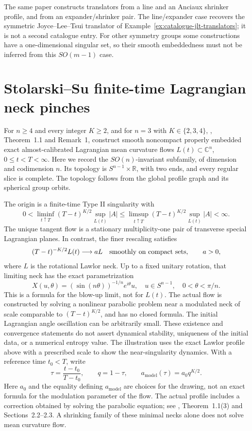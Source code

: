 \begin{example}
The same paper constructs translators from a line and an Anciaux shrinker profile, and from an expander/shrinker pair. The line/expander case recovers the symmetric Joyce--Lee--Tsui translator of Example~\ref{ex:catalogue-jlt-translators}; it is not a second catalogue entry. For other symmetry groups some constructions have a one-dimensional singular set, so their smooth embeddedness must not be inferred from this $SO(m-1)$ case.
\end{example}

\chapter{Stolarski--Su finite-time Lagrangian neck pinches}\label{sec:catalogue-stolarski-su}
\begin{example}\label{ex:catalogue-stolarski-su}
For $n\geq4$ and every integer $K\geq2$, and for $n=3$ with $K\in\{2,3,4\}$, \cite{CatStolarskiSu2026}, Theorem~1.1 and Remark~1, construct smooth noncompact properly embedded exact almost-calibrated Lagrangian mean curvature flows $L(t)\subset\mathbb C^n$, $0\leq t<T<\infty$. Here we record the $SO(n)$-invariant subfamily, of dimension and codimension $n$. Its topology is $S^{n-1}\times\mathbb R$, with two ends, and every regular slice is complete. The topology follows from the global profile graph and its spherical group orbits.

The origin is a finite-time Type II singularity with
\[
 0<\liminf_{t\uparrow T}(T-t)^{K/2}\sup_{L(t)}|A|
 \leq\limsup_{t\uparrow T}(T-t)^{K/2}\sup_{L(t)}|A|<\infty.
\]
The unique tangent flow is a stationary multiplicity-one pair of transverse special Lagrangian planes. In contrast, the finer rescaling satisfies
\[
 (T-t)^{-K/2}L(t)\longrightarrow aL
 \quad\hbox{smoothly on compact sets},\qquad a>0,
\]
where $L$ is the rotational Lawlor neck. Up to a fixed unitary rotation, that limiting neck has the exact parametrization
\[
 X(u,\theta)=(\sin(n\theta))^{-1/n}e^{i\theta}u,
 \quad u\in S^{n-1},\quad0<\theta<\pi/n.
\]
This is a formula for the blow-up limit, not for $L(t)$. The actual flow is constructed by solving a nonlinear parabolic problem near a modulated neck of scale comparable to $(T-t)^{K/2}$, and has no closed formula. The initial Lagrangian angle oscillation can be arbitrarily small. These existence and convergence statements do not assert dynamical stability, uniqueness of the initial data, or a numerical entropy value. The illustration uses the exact Lawlor profile above with a prescribed scale to show the near-singularity dynamics. With a reference time $t_0<T$, write
\[
 \tau=\frac{t-t_0}{T-t_0},\qquad q=1-\tau,\qquad
 a_{\mathrm{model}}(\tau)=a_0q^{K/2}.
\]
Here $a_0$ and the equality defining $a_{\mathrm{model}}$ are choices for the drawing, not an exact formula for the modulation parameter of the flow. The actual profile includes a correction obtained by solving the parabolic equation; see \cite{CatStolarskiSu2026}, Theorem~1.1(3) and Sections~2.2--2.3. A shrinking family of these minimal necks alone does not solve mean curvature flow.


\end{example}
